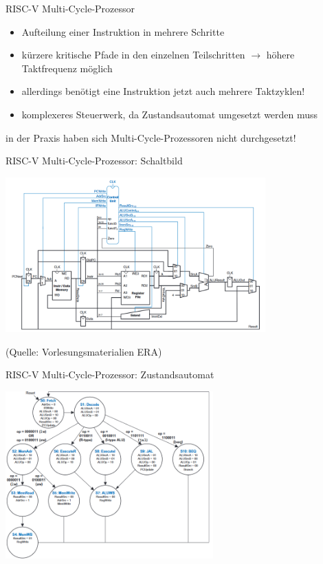 \documentclass[
  german,            %
  aspectratio=169,    %
]{tumbeamer}
\begin{document}
\begin{frame}[c, fragile]{RISC-V Multi-Cycle-Prozessor}{}
	\begin{itemize}
		\item Aufteilung einer Instruktion in mehrere Schritte
		\item kürzere kritische Pfade in den einzelnen Teilschritten $\rightarrow$ höhere Taktfrequenz möglich
		\item allerdings benötigt eine Instruktion jetzt auch mehrere Taktzyklen!
		\item komplexeres Steuerwerk, da Zustandsautomat umgesetzt werden muss
	\end{itemize}
	\begin{center}
		in der Praxis haben sich Multi-Cycle-Prozessoren nicht durchgesetzt!
	\end{center}
\end{frame}

\begin{frame}[c]{RISC-V Multi-Cycle-Prozessor: Schaltbild}{}
	\begin{center}
		\includegraphics[width=0.75\textwidth]{w09_multicycle.png}
	\end{center}
	\centering
	\tiny (Quelle: Vorlesungsmaterialien ERA)
\end{frame}

\begin{frame}[c]{RISC-V Multi-Cycle-Prozessor: Zustandsautomat}{}
	\begin{center}
		\includegraphics[width=0.6\textwidth]{w09_multicycle_states.png}
	\end{center}
	\centering
\end{frame}
\end{document}
